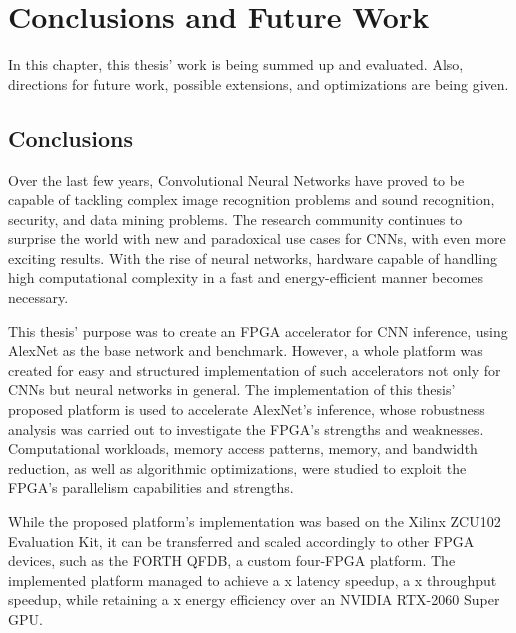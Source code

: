 \chapter{Conclusions and Future Work}
\label{Chapter-Conclusions-and-Future-Work}
In this chapter, this thesis' work is being summed up and evaluated. Also, directions for future work, possible extensions, and optimizations are being given.

\section{Conclusions}
Over the last few years, Convolutional Neural Networks have proved to be capable of tackling complex image recognition problems and sound recognition, security, and data mining problems. The research community continues to surprise the world with new and paradoxical use cases for CNNs, with even more exciting results. With the rise of neural networks, hardware capable of handling high computational complexity in a fast and energy-efficient manner becomes necessary.

This thesis' purpose was to create an FPGA accelerator for CNN inference, using AlexNet as the base network and benchmark. However, a whole platform was created for easy and structured implementation of such accelerators not only for CNNs but neural networks in general. The implementation of this thesis' proposed platform is used to accelerate AlexNet's inference, whose robustness analysis was carried out to investigate the FPGA's strengths and weaknesses. Computational workloads, memory access patterns, memory, and bandwidth reduction, as well as algorithmic optimizations, were studied to exploit the FPGA's parallelism capabilities and strengths.

While the proposed platform's implementation was based on the Xilinx ZCU102 Evaluation Kit, it can be transferred and scaled accordingly to other FPGA devices, such as the FORTH QFDB, a custom four-FPGA platform. The implemented platform managed to achieve a x latency speedup, a x throughput speedup, while retaining a x energy efficiency over an NVIDIA RTX-2060 Super GPU.

